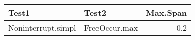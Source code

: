 \begin{table}
\centering
\begin{tabular}{llr}
\toprule
Test1 & Test2 & Max.Span\\
\midrule
Noninterrupt.simpl & FreeOccur.max & \cellcolor{red!25}0.2\\
\bottomrule
\end{tabular}
\end{table}
